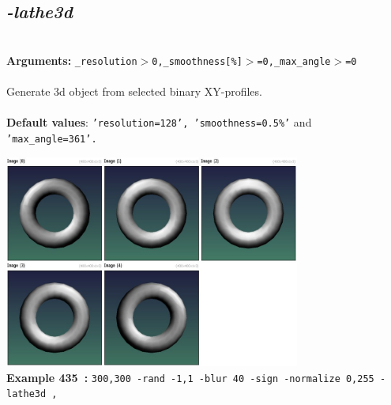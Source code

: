 \documentclass[a4paper,11pt,twoside]{book}
\begin{document}
\subsection{\emph{-lathe3d} }\vspace*{-0.5em}
~\\\textbf{Arguments: } 
{\small \texttt{\_resolution$>$0,\_smoothness[\%]$>$=0,\_max\_angle$>$=0}}\\~\\
Generate 3d object from selected binary XY-profiles.
~\\~\\\textbf{Default values}: {\small \texttt{'resolution=128', 'smoothness=0.5\%'} and \texttt{'max\_angle=361'.}}
\begin{center}\includegraphics[keepaspectratio=true,height=7cm,width=\textwidth]{img/gmic_def435.jpg}\\
{\footnotesize \textbf{Example 435~:} \texttt{300,300 -rand -1,1 -blur 40 -sign -normalize 0,255 -lathe3d ,}}
\end{center}
\end{document}
